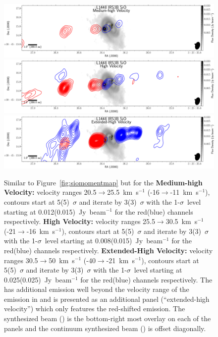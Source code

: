 \begin{figure}[H]
   \begin{center}
\includegraphics[width=\textwidth]{img/L1448IRS3B-SiO_high.pdf}
\includegraphics[width=\textwidth]{img/L1448IRS3B-SiO_ultrahigh.pdf}
\includegraphics[width=\textwidth]{img/L1448IRS3B-SiO_extendedhigh.pdf}
   \end{center} 
   \caption{Similar to Figure~\ref{fig:siomomentmap} but for the \textbf{Medium-high Velocity:} velocity ranges 20.5$\rightarrow$25.5~km~s$^{-1}$ (-16$\rightarrow$-11~km~s$^{-1}$), contours start at 5(5)~$\sigma$ and iterate by 3(3)~$\sigma$ with the 1-$\sigma$~level starting at 0.012(0.015)~Jy~beam$^{-1}$ for the red(blue) channels respectively. \textbf{High Velocity:} velocity ranges 25.5$\rightarrow$30.5~km~s$^{-1}$ (-21$\rightarrow$-16~km~s$^{-1}$), contours start at 5(5)~$\sigma$ and iterate by 3(3)~$\sigma$ with the 1-$\sigma$~level starting at 0.008(0.015)~Jy~beam$^{-1}$ for the red(blue) channels respectively. \textbf{Extended-High Velocity:} velocity ranges 30.5$\rightarrow$50~km~s$^{-1}$ (-40$\rightarrow$-21~km~s$^{-1}$), contours start at 5(5)~$\sigma$ and iterate by 3(3)~$\sigma$ with the 1-$\sigma$~level starting at 0.025(0.025)~Jy~beam$^{-1}$ for the red(blue) channels respectively. The \sio\space has additional emission well beyond the velocity range of the emission in \co\space and is presented as an additional panel (``extended-high velocity'') which only features the red-shifted emission. The \sio\space synthesized beam (\siobeam) is the bottom-right most overlay on each of the panels and the continuum synthesized beam (\contbeam) is offset diagonally. }\label{fig:siomomentmap2}
\end{figure}
